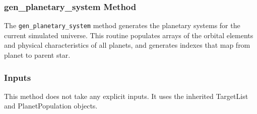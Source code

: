 \documentclass[cleanfoot]{asme2ej}
\begin{document}
\subsubsection{gen\_planetary\_system Method} \label{sec:genplanetarysystemstask}
The \verb+gen_planetary_system+ method generates the planetary systems for the current simulated universe. This routine populates arrays of the orbital elements and physical characteristics of all planets, and generates indexes that map from planet to parent star.

\subsubsection*{Inputs}
This method does not take any explicit inputs.  It uses the inherited TargetList and PlanetPopulation objects.
\end{document}
